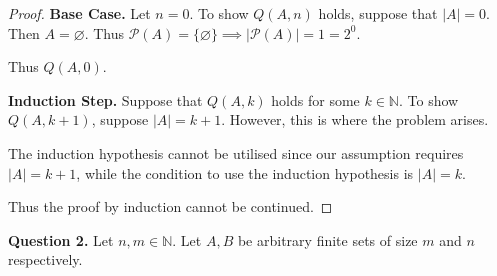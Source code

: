 \documentclass[11pt]{article}
\begin{document}
\begin{enumerate}[label=\alph*)]
\begin{proof}
            \textbf{Base Case.} Let \(n=0\). To show \(Q(A, n)\) holds, suppose that \(\left\vert A \right\vert = 0\). Then \(A = \varnothing \). Thus \(\mathcal{P} (A) = \{ \varnothing  \} \implies \left\vert \mathcal{P} (A) \right\vert = 1 = 2^0 \).
            
            Thus \(Q(A, 0)\).

            \textbf{Induction Step.} Suppose that \(Q(A, k)\) holds for some \(k \in \mathbb{N}\). To show \(Q(A, k+1)\), suppose \(\left\vert A \right\vert = k+1\). However, this is where the problem arises. 

            The induction hypothesis cannot be utilised since our assumption requires \(\left\vert A \right\vert = k+1\), while the condition to use the induction hypothesis is \(\left\vert A \right\vert = k\).
            
            Thus the proof by induction cannot be continued.

        \end{proof}
    \end{enumerate}
    \pagebreak
    \noindent\textbf{Question 2.} Let \(n,m \in \mathbb{N}\). Let \(A, B\) be arbitrary finite sets of size \(m\) and \(n\) respectively.
\end{document}
